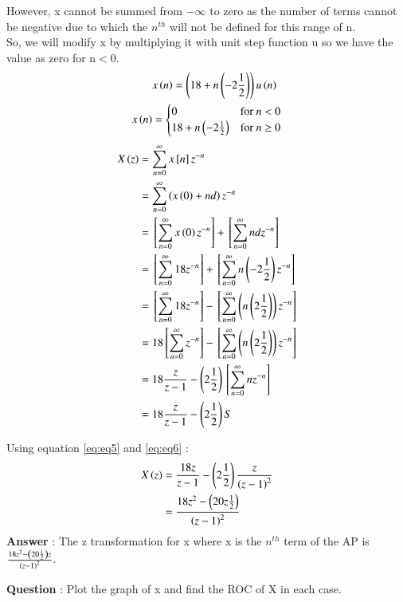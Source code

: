\documentclass[journal,12pt,twocolumn]{IEEEtran}
\theoremstyle{remark}
\begin{document}
However, x cannot be summed from $-\infty$ to zero as the number of terms cannot be negative due to which the $n^{th}$ will not be defined for this range of n.\\
So, we will modify x by multiplying it with unit step function u so we have the value as zero for n$<$0.
\begin{align}
&x\left(n\right) = \left(18 + n\left(-2\frac{1}{2}\right)\right)u\left(n\right) \\
     x\left(n\right) & = \begin{cases}
        0 & \text{for } n < 0 \\
        18 + n\left(-2\frac{1}{2}\right) & \text{for } n \geq 0
    \end{cases}
\end{align}
\begin{align}
X\left(z\right) &= \sum_{n=0}^{\infty}x{}\left[n\right]z^{-n}\\
 &= \sum_{n=0}^{\infty}\left(x\left(0\right) + nd\right)z^{-n} \\
 &=  {}\left[\sum_{n=0}^{\infty}x\left(0\right)z^{-n}\right] + {}\left[\sum_{n=0}^{\infty}ndz^{-n}\right]\\
 &=  {}\left[\sum_{n=0}^{\infty}18z^{-n}\right] + {}\left[\sum_{n=0}^{\infty}n\left(-2\frac{1}{2}\right)z^{-n}\right]\\
 &=  {}\left[\sum_{n=0}^{\infty}18z^{-n}\right] - {}\left[\sum_{n=0}^{\infty}\left(n\left(2\frac{1}{2}\right)\right)z^{-n} \right]\\
 &= 18{}\left[\sum_{n=0}^{\infty}z^{-n}\right] - {}\left[\sum_{n=0}^{\infty}\left(n\left(2\frac{1}{2}\right)\right)z^{-n}\right]\label{eq:eq8}\\ 
 &= 18\frac{z}{z-1} - \left(2\frac{1}{2}\right){}\left[\sum_{n=0}^{\infty}nz^{-n}\right]\\
 &= 18\frac{z}{z-1} - \left(2\frac{1}{2}\right)S \label{eq:eq6}
\end{align}

Using equation \eqref{eq:eq5} and \eqref{eq:eq6} : \\
\begin{align}
X\left(z\right) &=  \frac{18z}{z-1} - \left(2\frac{1}{2}\right)\frac{z}{\left(z-1\right)^2}\\
&= \frac{18z^{2} - \left(20z\frac{1}{2}\right)}{\left(z-1\right)^2}
\end{align}
\large\textbf{Answer} : \normalsize The z transformation for x where x is the $n^{th}$ term of the AP is $\frac{18z^{2} - \left(20\frac{1}{2}\right)z}{\left(z-1\right)^2}$.

\vspace{4mm}

\large\textbf{Question} : \normalsize Plot the graph of x and find the ROC of X in each case.
\end{document}
